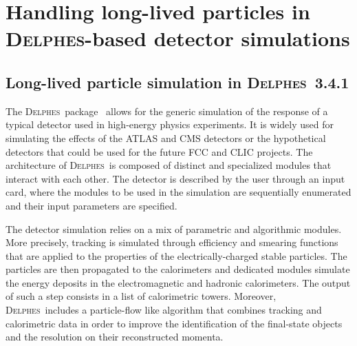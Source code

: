 
\newcommand{\MG}{\textsc{MadGraph}~5\_aMC@NLO}
\newcommand{\PY}{\textsc{Pythia}~8}
\newcommand{\MA}{\textsc{MadAnalysis}~5}
\newcommand{\MW}{\textsc{MadWidth}}
\newcommand{\MAnorm}{{MadAnalysis}~5}
\newcommand{\FJ}{\textsc{FastJet}}
\newcommand{\DEL}{\textsc{Delphes}}
\newcommand{\ROOT}{\textsc{Root}}




\section{Handling long-lived particles in \DEL-based detector simulations}
\label{sec:ch5-recastingDelphes}

\subsection{Long-lived particle simulation in \DEL~3.4.1}

The \DEL\ package~\cite{deFavereau:2013fsa} allows for the generic simulation of
the response of a typical detector used in high-energy physics experiments. It
is widely used for simulating the effects of the ATLAS and CMS detectors or the
hypothetical detectors that could be used for the future FCC and CLIC projects.
The architecture of \DEL\ is composed of distinct
and specialized modules that interact with each other. The detector is described
by the user through an input card, where the modules to be used in the
simulation are sequentially enumerated and their input parameters are specified.

The detector simulation relies on a mix of parametric and algorithmic
modules. More precisely, tracking is simulated through efficiency and smearing
functions that are applied to the properties of the electrically-charged stable
particles. The particles are then propagated to the calorimeters and dedicated
modules simulate the energy deposits in the electromagnetic and hadronic
calorimeters. The output of such a step consists in a list of calorimetric towers.
Moreover, \DEL\ includes a particle-flow like
algorithm that combines tracking and calorimetric data in order to
improve the identification of the final-state objects and the resolution on
their reconstructed momenta.

